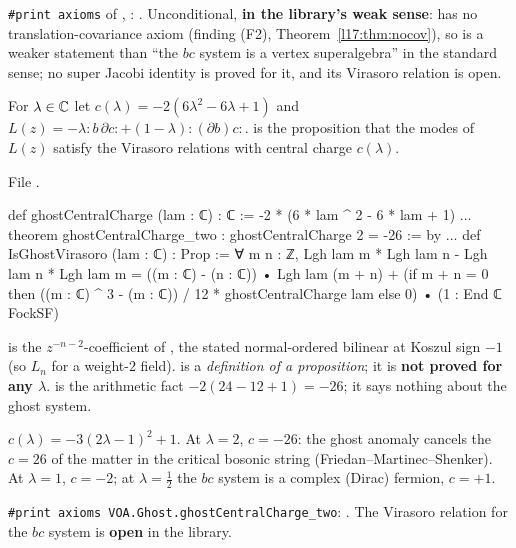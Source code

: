 \begin{status}
\texttt{\#print axioms} of , :
. Unconditional, \textbf{in the library's weak sense}: 
has no translation-covariance axiom (finding (F2), Theorem~\ref{l17:thm:nocov}), so  is a weaker statement
than ``the $bc$ system is a vertex superalgebra'' in the standard sense; no super Jacobi identity is proved for it, and its
Virasoro relation is open.
\end{status}

\begin{definition}\label{l17:def:ghostvir}
For $\lambda\in{\mathbb{C}}$ let $c(\lambda)=-2(6\lambda^2-6\lambda+1)$ and
$L(z)=-\lambda{:}b\,\partial c{:}+(1-\lambda){:}(\partial b)c{:}$.  is the
proposition that the modes of $L(z)$ satisfy the Virasoro relations with central charge $c(\lambda)$.
\end{definition}
\noindent File .
\begin{leancode}
def ghostCentralCharge (lam : ℂ) : ℂ := -2 * (6 * lam ^ 2 - 6 * lam + 1)
...
theorem ghostCentralCharge_two : ghostCentralCharge 2 = -26 := by
...
def IsGhostVirasoro (lam : ℂ) : Prop :=
  ∀ m n : ℤ, Lgh lam m * Lgh lam n - Lgh lam n * Lgh lam m
    = ((m : ℂ) - (n : ℂ)) • Lgh lam (m + n)
      + (if m + n = 0 then ((m : ℂ) ^ 3 - (m : ℂ)) / 12 * ghostCentralCharge lam else 0)
          • (1 : End ℂ FockSF)
\end{leancode}
\begin{dictionary}
 is the $z^{-n-2}$-coefficient of , the stated normal-ordered
bilinear at Koszul sign $-1$ (so $L_n$ for a weight-$2$ field).  is a
\emph{definition of a proposition}; it is \textbf{not proved for any $\lambda$}.
 is the arithmetic fact $-2(24-12+1)=-26$; it says nothing about the
ghost system.
\end{dictionary}
\begin{physics}
$c(\lambda)=-3(2\lambda-1)^2+1$. At $\lambda=2$, $c=-26$: the ghost anomaly cancels the $c=26$ of the
matter in the critical bosonic string (Friedan--Martinec--Shenker). At $\lambda=1$, $c=-2$; at
$\lambda=\frac12$ the $bc$ system is a complex (Dirac) fermion, $c=+1$.
\end{physics}
\begin{status}
\texttt{\#print axioms VOA.Ghost.ghostCentralCharge\_two}: . The Virasoro relation for the $bc$ system is \textbf{open} in the library.
\end{status}

